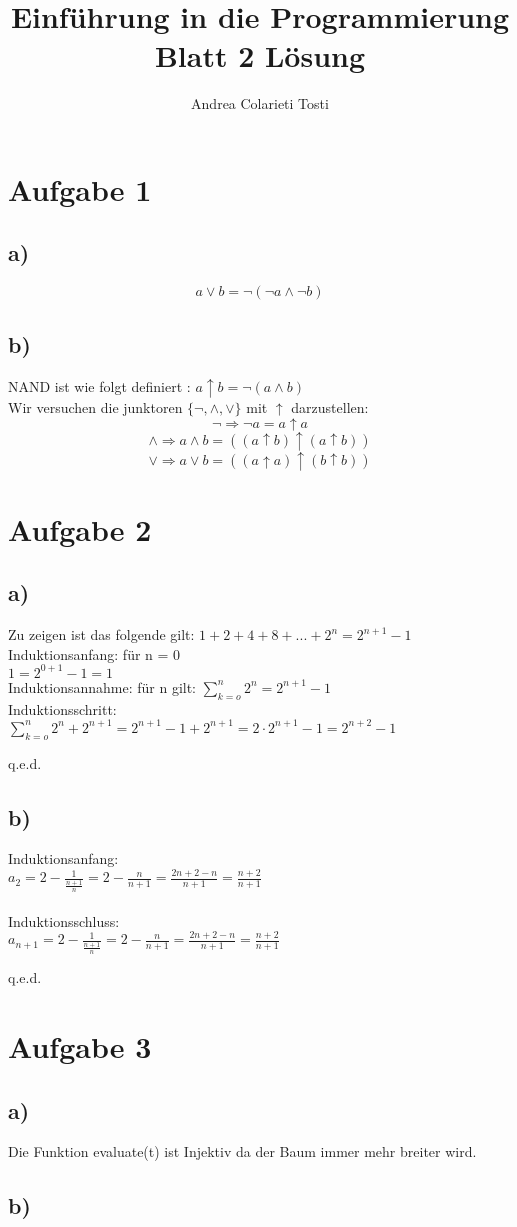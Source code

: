 \documentclass[14pt,a4paper]{article}
\author{Andrea Colarieti Tosti}
\title{Einführung in die Programmierung Blatt 2 Lösung}
\begin{document}
\maketitle
\section*{Aufgabe 1}
\subsection*{a)}
$$
  a \vee b = \neg ( \neg a \wedge \neg b)
$$
\subsection*{b)}
NAND ist wie folgt definiert :
$  a \uparrow b = \neg (a \wedge b) $\\
Wir versuchen die junktoren $\{ \neg ,\wedge,\vee\}$ mit $\uparrow$ darzustellen: \\
$$
\neg \Rightarrow \neg a = a \uparrow a
$$ $$
\wedge \Rightarrow a \wedge b = ((a \uparrow b) \uparrow (a \uparrow b))
$$ $$
\vee \Rightarrow a \vee b = ((a \uparrow a) \uparrow (b \uparrow b)) 
$$
\section*{Aufgabe 2}
\subsection*{a)}
Zu zeigen ist das folgende gilt: $ 1+2+4+8+...+2^n = 2^{n+1} -1$\\
Induktionsanfang: für n = 0 \\
$ 1 = 2^{0+1}-1=1$\\
Induktionsannahme: für n gilt:
$\sum_{k=o}^n 2^n = 2^{n+1}-1 $\\
Induktionsschritt:\\
$\sum_{k=o}^n 2^n + 2^{n+1} = 2^{n+1}-1 + 2^{n+1} = 2 \cdot 2^{n+1}-1 = 2^{n+2}-1 $
\begin{flushright}
q.e.d.
\end{flushright}
\subsection*{b)}
Induktionsanfang: \\
$ a_2 = 2- \frac{1}{\frac{n+1}{n}} = 2-\frac{n}{n+1} = \frac{2n+2-n}{n+1} = \frac{n+2}{n+1}$\\\\
Induktionsschluss:\\
$ a_{n+1} = 2 - \frac{1}{\frac{n+1}{n}} = 2 - \frac{n}{n+1} = \frac{2n+2-n}{n+1} = \frac{n+2}{n+1}$
\begin{flushright} q.e.d. \end{flushright}

\section*{Aufgabe 3}
\subsection*{a)}
Die Funktion evaluate(t) ist Injektiv da der Baum immer mehr breiter wird.
\subsection*{b)}
 
\end{document}
